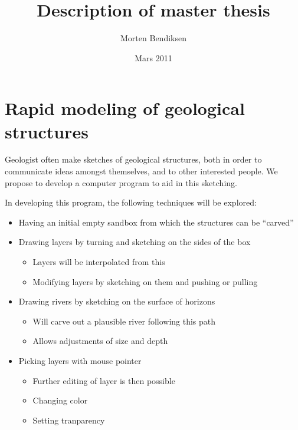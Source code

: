 \documentclass[12pt,a4paper]{article}
\begin{document}
\title{Description of master thesis}
\author{Morten Bendiksen}
\date{Mars 2011}
\maketitle

\section*{Rapid modeling of geological structures}


Geologist often make sketches of geological structures, both in order to communicate ideas amongst themselves, and to other interested people. We propose to develop a computer program to aid in this sketching.

In developing this program, the following techniques will be explored:
\begin{itemize}
 \item Having an initial empty sandbox from which the structures can be ``carved''
 \item Drawing layers by turning and sketching on the sides of the box
    \begin{itemize}
     \item Layers will be interpolated from this
     \item Modifying layers by sketching on them and pushing or pulling
    \end{itemize}
 \item Drawing rivers by sketching on the surface of horizons
    \begin{itemize}
     \item Will carve out a plausible river following this path
     \item Allows adjustments of size and depth
    \end{itemize}
\item Picking layers with mouse pointer
    \begin{itemize}
     \item Further editing of layer is then possible
     \item Changing color
     \item Setting tranparency
    \end{itemize}
\end{itemize}
\end{document}
